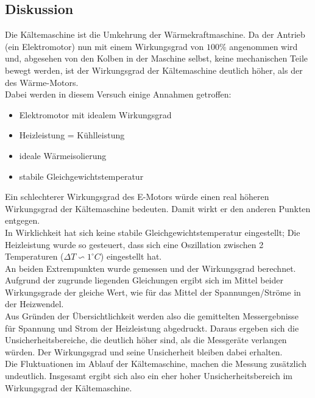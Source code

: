 \documentclass[12pt,a4paper]{article}
\begin{document}
\begin{multicols}{2}
\subsection{Diskussion}

Die Kältemaschine ist die Umkehrung der Wärmekraftmaschine. Da der Antrieb (ein Elektromotor) nun mit einem Wirkungsgrad von $100\%$ angenommen wird und, abgesehen von den Kolben in der Maschine selbst, keine mechanischen Teile bewegt werden, ist der Wirkungsgrad der Kältemaschine deutlich höher, als der des Wärme-Motors.\\
Dabei werden in diesem Versuch einige Annahmen getroffen:\\
\begin{itemize}
\item Elektromotor mit idealem Wirkungsgrad
\item Heizleistung = Kühlleistung
\item ideale Wärmeisolierung
\item stabile Gleichgewichtstemperatur
\end{itemize}

\noindent Ein schlechterer Wirkungsgrad des E-Motors würde einen real höheren Wirkungsgrad der Kältemaschine bedeuten. Damit wirkt er den anderen Punkten entgegen.\\
In Wirklichkeit hat sich keine stabile Gleichgewichtstemperatur eingestellt; Die Heizleistung wurde so gesteuert, dass sich eine Oszillation zwischen 2 Temperaturen ($\Delta T \backsim 1^\circ C$) eingestellt hat.\\
An beiden Extrempunkten wurde gemessen und der Wirkungsgrad berechnet. Aufgrund der zugrunde liegenden Gleichungen ergibt sich im Mittel beider Wirkungsgrade der gleiche Wert, wie für das Mittel der Spannungen/Ströme in der Heizwendel.\\
Aus Gründen der Übersichtlichkeit werden also die gemittelten Messergebnisse für Spannung und Strom der Heizleistung abgedruckt. Daraus ergeben sich die Unsicherheitsbereiche, die deutlich höher sind, als die Messgeräte verlangen würden.
Der Wirkungsgrad und seine Unsicherheit bleiben dabei erhalten.\\
Die Fluktuationen im Ablauf der Kältemaschine, machen die Messung zusätzlich undeutlich. Insgesamt ergibt sich also ein eher hoher Unsicherheitsbereich im Wirkungsgrad der Kältemaschine.\\


\end{multicols}
\end{document}
